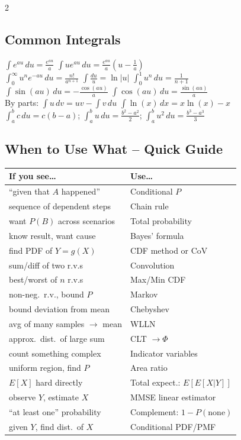 \documentclass[10pt]{article}
\begin{document}
\begin{multicols*}{2}
\subsection{Common Integrals}
$\int e^{au}\,du = \frac{e^{au}}{a}$ \qquad
$\int u e^{au}\,du = \frac{e^{au}}{a}\!\left(u - \frac{1}{a}\right)$ \\[1pt]
$\int_0^{\infty} u^n e^{-au}\,du = \frac{n!}{a^{n+1}}$ \;\;
$\int \frac{du}{u} = \ln|u|$ \;\;
$\int_0^1 u^n\,du = \frac{1}{n+1}$ \\[1pt]
$\int \sin(au)\,du = -\frac{\cos(au)}{a}$ \;\; $\int \cos(au)\,du = \frac{\sin(au)}{a}$ \\[1pt]
By parts: $\int u\,dv = uv - \int v\,du$ \;\;
$\int \ln(x)\,dx = x\ln(x) - x$ \\[1pt]
$\int_a^b c\,du = c(b-a)$;\;\; $\int_a^b u\,du = \frac{b^2-a^2}{2}$;\;\; $\int_a^b u^2\,du = \frac{b^3-a^3}{3}$

\subsection{When to Use What -- Quick Guide}
\renewcommand{\arraystretch}{1.1}
\begin{tabular}{@{}p{} p{}@{}}
\textbf{If you see\ldots} & \textbf{Use\ldots} \\
\hline
``given that $A$ happened'' & Conditional $P$ \\
sequence of dependent steps & Chain rule \\
want $P(B)$ across scenarios & Total probability \\
know result, want cause & Bayes' formula \\
find PDF of $Y = g(X)$ & CDF method or CoV \\
sum/diff of two r.v.s & Convolution \\
best/worst of $n$ r.v.s & Max/Min CDF \\
non-neg.\ r.v., bound $P$ & Markov \\
bound deviation from mean & Chebyshev \\
avg of many samples $\to$ mean & WLLN \\
approx.\ dist.\ of large sum & CLT $\to \Phi$ \\
count something complex & Indicator variables \\
uniform region, find $P$ & Area ratio \\
$E[X]$ hard directly & Total expect.: $E[E[X|Y]]$ \\
observe $Y$, estimate $X$ & MMSE linear estimator \\
``at least one'' probability & Complement: $1 - P(\text{none})$ \\
given $Y$, find dist.\ of $X$ & Conditional PDF/PMF \\
\end{tabular}


\end{multicols*}
\end{document}
